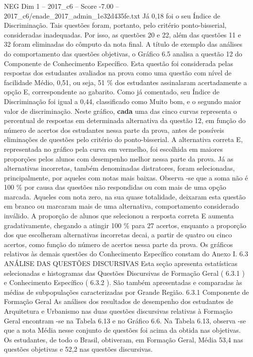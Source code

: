 \begin{textsample}{NEG Dim 1 – 2017\_c6 – Score -7.00 – 2017\_c6/enade\_2017\_admin\_1e32d435fe.txt}
Já 0,18 foi o seu Índice de Discriminação.
Tais questões foram, portanto, pelo critério ponto-bisserial, consideradas inadequadas.
Por isso, as questões 20 e 22, além das questões 11 e 32 foram eliminadas do cômputo da nota final.
A título de exemplo das análises do comportamento das questões objetivas, o Gráfico 6.5 analisa a questão 12 do Componente de Conhecimento Específico.
Esta questão foi considerada pelas respostas dos estudantes avaliados na prova como uma questão com nível de facilidade Médio, 0,51, ou seja, 51 \% dos estudantes assinalaram acertadamente a opção E, correspondente ao gabarito.
Como já comentado, seu Índice de Discriminação foi igual a 0,44, classificado como Muito bom, e o segundo maior valor de discriminação.
Neste gráfico, \textbf{cada} uma das cinco curvas representa o percentual de respostas em determinada alternativa da questão 12, em função do número de acertos dos estudantes nessa parte da prova, antes de possíveis eliminações de questões pelo critério do ponto-bisserial.
A alternativa correta E, representada no gráfico pela curva em vermelho, foi escolhida em maiores proporções pelos alunos com desempenho melhor nessa parte da prova.
Já as alternativas incorretas, também denominadas distratores, foram selecionadas, principalmente, por aqueles com notas mais baixas.
Observa -se que a soma não é 100 \% por causa das questões não respondidas ou com mais de uma opção marcada.
Aqueles com nota zero, na sua quase totalidade, deixaram esta questão em branco ou marcaram mais de uma alternativa, comportamento considerado inválido.
A proporção de alunos que selecionou a resposta correta E aumenta gradativamente, chegando a atingir 100 \% para 27 acertos, enquanto a proporção dos que escolheram alternativas incorretas decai, a partir de quatro ou cinco acertos, como função do número de acertos nessa parte da prova.
Os gráficos relativos às demais questões do Conhecimento Específico constam do Anexo I. 6.3 ANÁLISE DAS QUESTÕES DISCURSIVAS Esta seção apresenta estatísticas selecionadas e histogramas das Questões Discursivas de Formação Geral ( 6.3.1 ) e Conhecimento Específico ( 6.3.2 ).
São também apresentadas e comparadas às médias de subpopulações caracterizadas por Grande Região. 6.3.1 Componente de Formação Geral As análises dos resultados de desempenho dos estudantes de Arquitetura e Urbanismo nas duas questões discursivas relativas à Formação Geral encontram -se na Tabela 6.13 e no Gráfico 6.6.
Na Tabela 6.13, observa -se que a nota Média nesse conjunto de questões foi acima da obtida nas objetivas.
Os estudantes, de todo o Brasil, obtiveram, em Formação Geral, Média 53,4 nas questões objetivas e 52,2 nas questões discursivas.

\end{textsample}
